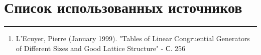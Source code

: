 \documentclass[a4paper, 14pt]{extarticle}
\begin{document}

\newpage
\section{Список использованных источников}\vspace{-20pt}\rule{\linewidth}{0.1mm}
\begin{enumerate}
  \item \label{item:source1} L'Ecuyer, Pierre (January 1999). "Tables of Linear Congruential Generators of Different Sizes and Good Lattice Structure" - С. 256
\end{enumerate}
\end{document}
